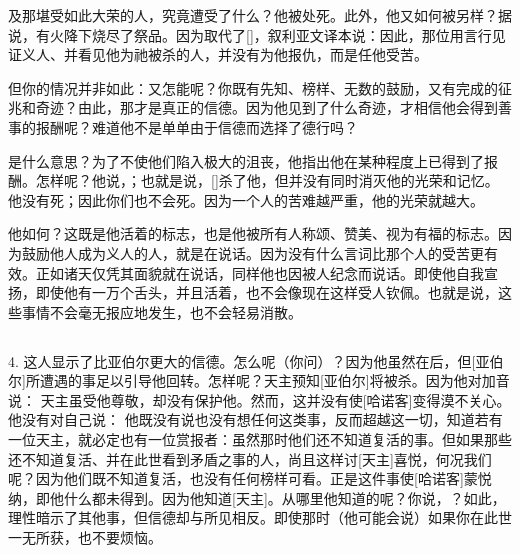 及那堪受如此大荣的人，究竟遭受了什么？他被处死。此外，他又如何被另样？据说，有火降下烧尽了祭品。因为取代了[]，叙利亚文译本说：因此，那位用言行见证义人、并看见他为祂被杀的人，并没有为他报仇，而是任他受苦。\par

但你的情况并非如此：又怎能呢？你既有先知、榜样、无数的鼓励，又有完成的征兆和奇迹？由此，那才是真正的信德。因为他见到了什么奇迹，才相信他会得到善事的报酬呢？难道他不是单单由于信德而选择了德行吗？\par

是什么意思？为了不使他们陷入极大的沮丧，他指出他在某种程度上已得到了报酬。怎样呢？他说，；也就是说，[]杀了他，但并没有同时消灭他的光荣和记忆。他没有死；因此你们也不会死。因为一个人的苦难越严重，他的光荣就越大。\par

他如何？这既是他活着的标志，也是他被所有人称颂、赞美、视为有福的标志。因为鼓励他人成为义人的人，就是在说话。因为没有什么言词比那个人的受苦更有效。正如诸天仅凭其面貌就在说话，同样他也因被人纪念而说话。即使他自我宣扬，即使他有一万个舌头，并且活着，也不会像现在这样受人钦佩。也就是说，这些事情不会毫无报应地发生，也不会轻易消散。\par


\subsection{}

4.  这人显示了比亚伯尔更大的信德。怎么呢（你问）？因为他虽然在后，但[亚伯尔]所遭遇的事足以引导他回转。怎样呢？天主预知[亚伯尔]将被杀。因为他对加音说： 天主虽受他尊敬，却没有保护他。然而，这并没有使[哈诺客]变得漠不关心。他没有对自己说： 他既没有说也没有想任何这类事，反而超越这一切，知道若有一位天主，就必定也有一位赏报者：虽然那时他们还不知道复活的事。但如果那些还不知道复活、并在此世看到矛盾之事的人，尚且这样讨[天主]喜悦，何况我们呢？因为他们既不知道复活，也没有任何榜样可看。正是这件事使[哈诺客]蒙悦纳，即他什么都未得到。因为他知道[天主]。从哪里他知道的呢？你说，？如此，理性暗示了其他事，但信德却与所见相反。即使那时（他可能会说）如果你在此世一无所获，也不要烦恼。\par

